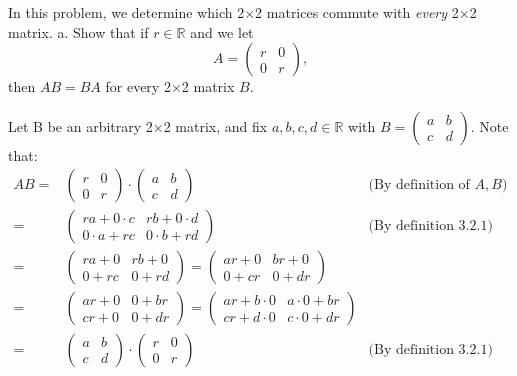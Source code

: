 \documentclass[12pt]{article}
\newenvironment{problem}[2][Problem]
{
	\begin{trivlist} 
		\item[\hskip \labelsep {\bfseries #1 #2:}]
	}
{
	\end{trivlist}
	}
\newenvironment{solution}[1][Solution]
{
	\begin{trivlist} 
		\item[\hskip \labelsep {\itshape #1:}]
	}
	{
	\end{trivlist}
}
\begin{document}
\newpage
\begin{problem}{3}
In this problem, we determine which 2$\times$2 matrices commute with {\it every} 2$\times$2 matrix.
\noindent
\newline
a. Show that if $r \in \mathbb{R}$ and we let
\[
A=\begin{pmatrix}r&0\\0&r\end{pmatrix}\text{,}
\]
then $AB=BA$ for every 2$\times$2 matrix $B$.
\begin{solution}
Let B be an arbitrary 2$\times$2 matrix, and fix $a,b,c,d \in \mathbb{R}$ with $B= \begin{pmatrix} a & b \\ c& d \end{pmatrix}$. Note that:
\begin{align*}
AB =& \begin{pmatrix}r&0\\0&r\end{pmatrix} \cdot \begin{pmatrix} a & b \\ c& d \end{pmatrix} & \text{(By definition of $A,B$)}\\
=& \begin{pmatrix} ra + 0\cdot c & rb + 0\cdot d \\ 0\cdot a + rc & 0\cdot b + rd\end{pmatrix} & \text{(By definition 3.2.1)}\\
=&\begin{pmatrix} ra +  0 & rb + 0 \\ 0 + rc &  0 + rd \end{pmatrix} =\begin{pmatrix} ar +  0 & br + 0 \\ 0 + cr &  0 + dr \end{pmatrix} & \\
=&\begin{pmatrix} ar +  0 & 0 + br \\ cr + 0 &  0 + dr \end{pmatrix} =\begin{pmatrix} ar + b\cdot 0 & a\cdot 0 + br \\ cr + d\cdot 0 &  c\cdot 0 + dr \end{pmatrix} & \\
=& \begin{pmatrix} a & b \\ c& d \end{pmatrix} \cdot \begin{pmatrix}r&0\\0&r\end{pmatrix} & \text{(By definition 3.2.1)}\\

\end{align*}
\end{solution}
\end{problem}
\end{document}
